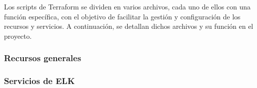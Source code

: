 Los scripts de Terraform se dividen en varios archivos, cada uno de ellos con
una función específica, con el objetivo de facilitar la gestión y configuración
de los recursos y servicios. A continuación, se detallan dichos archivos y su
función en el proyecto.


\subsubsection{Recursos generales}


\subsubsection{Servicios de ELK}
